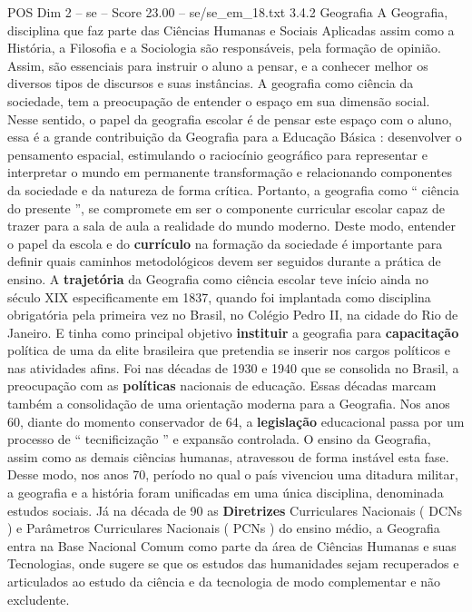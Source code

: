 \begin{textsample}{POS Dim 2 – se – Score 23.00 – se/se\_em\_18.txt}  \label{ex:f2_pos_026}
3.4.2 Geografia A Geografia, disciplina que faz parte das Ciências Humanas e Sociais Aplicadas assim como a História, a Filosofia e a Sociologia são responsáveis, pela formação de opinião.
Assim, são essenciais para instruir o aluno a pensar, e a conhecer melhor os diversos tipos de discursos e suas instâncias.
A geografia como ciência da sociedade, tem a preocupação de entender o espaço em sua dimensão social.
Nesse sentido, o papel da geografia escolar é de pensar este espaço com o aluno, essa é a grande contribuição da Geografia para a Educação Básica : desenvolver o pensamento espacial, estimulando o raciocínio geográfico para representar e interpretar o mundo em permanente transformação e relacionando componentes da sociedade e da natureza de forma crítica.
Portanto, a geografia como “ ciência do presente ”, se compromete em ser o componente curricular escolar capaz de trazer para a sala de aula a realidade do mundo moderno.
Deste modo, entender o papel da escola e do \textbf{currículo} na formação da sociedade é importante para definir quais caminhos metodológicos devem ser seguidos durante a prática de ensino.
A \textbf{trajetória} da Geografia como ciência escolar teve início ainda no século XIX especificamente em 1837, quando foi implantada como disciplina obrigatória pela primeira vez no Brasil, no Colégio Pedro II, na cidade do Rio de Janeiro.
E tinha como principal objetivo \textbf{instituir} a geografia para \textbf{capacitação} política de uma da elite brasileira que pretendia se inserir nos cargos políticos e nas atividades afins.
Foi nas décadas de 1930 e 1940 que se consolida no Brasil, a preocupação com as \textbf{políticas} nacionais de educação.
Essas décadas marcam também a consolidação de uma orientação moderna para a Geografia.
Nos anos 60, diante do momento conservador de 64, a \textbf{legislação} educacional passa por um processo de “ tecnificização ” e expansão controlada.
O ensino da Geografia, assim como as demais ciências humanas, atravessou de forma instável esta fase.
Desse modo, nos anos 70, período no qual o país vivenciou uma ditadura militar, a geografia e a história foram unificadas em uma única disciplina, denominada estudos sociais.
Já na década de 90 as \textbf{Diretrizes} Curriculares Nacionais ( DCNs ) e Parâmetros Curriculares Nacionais ( PCNs ) do ensino médio, a Geografia entra na Base Nacional Comum como parte da área de Ciências Humanas e suas Tecnologias, onde sugere se que os estudos das humanidades sejam recuperados e articulados ao estudo da ciência e da tecnologia de modo complementar e não excludente.

\end{textsample}
